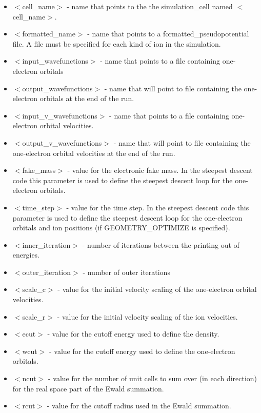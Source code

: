 \begin{itemize}
	\item $<$cell\_name$>$ - name that points to the
              the simulation\_cell named $<$cell\_name$>$.
	\item $<$formatted\_name$>$ - name that points
              to a formatted\_pseudopotential file.  A file must
              be specified for each kind of ion in the simulation.
	\item $<$input\_wavefunctions$>$ - name that points
              to a file containing one-electron orbitals
	\item $<$output\_wavefunctions$>$ - name that will
              point to file containing the one-electron orbitals at the
              end of the run. 
	\item $<$input\_v\_wavefunctions$>$ - name that points
              to a file containing one-electron orbital velocities.
	\item $<$output\_v\_wavefunctions$>$ - name that will
              point to file containing the one-electron orbital velocities
	      at the end of the run. 
	\item $<$fake\_mass$>$ - value for the electronic
              fake mass.  In the steepest descent code this parameter is
              used to define the steepest descent loop for the one-electron
              orbitals.
	\item $<$time\_step$>$ - value for the time step.
               In the steepest descent code this parameter is used to
               define the steepest descent loop for the one-electron orbitals
               and ion positions (if GEOMETRY\_OPTIMIZE is specified).
	\item $<$inner\_iteration$>$ - number of iterations between the
              printing out of energies.
	\item $<$outer\_iteration$>$ - number of outer iterations
 	\item $<$scale\_c$>$ - value for the initial velocity
			      scaling of the one-electron orbital velocities.
	\item $<$scale\_r$>$ - value for the initial velocity
			      scaling of the ion velocities.
	\item $<$ecut$>$ - value for the cutoff energy used
                           to define the density.
	\item $<$wcut$>$ - value for the cutoff energy used
 			   to define the one-electron orbitals.
	\item $<$ncut$>$ - value for the number of unit cells
 			  to sum over (in each direction) for the real space
			  part of the Ewald summation.
	\item $<$rcut$>$ - value for the cutoff radius used
			  in the Ewald summation.
\end{itemize}



